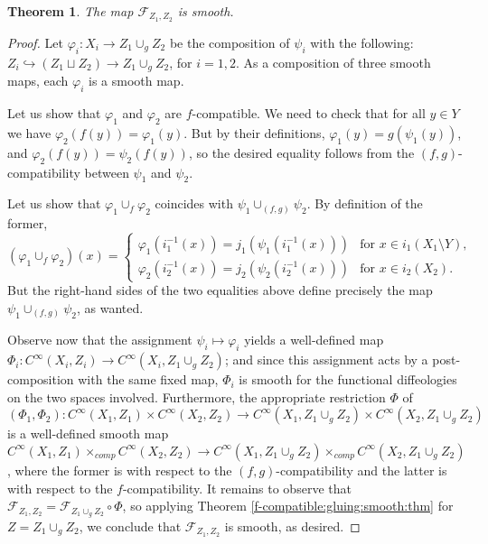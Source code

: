 \documentclass{article}
\newtheorem{thm}[lemma]{Theorem}
\begin{document}
\begin{thm}\label{f-g-compatible:gluing:smooth:thm}
The map $\mathcal{F}_{Z_1,Z_2}$ is smooth.
\end{thm}

\begin{proof}
Let $\varphi_i:X_i\to Z_1\cup_g Z_2$ be the composition of $\psi_i$ with the following: $Z_i\hookrightarrow(Z_1\sqcup Z_2)\to Z_1\cup_g Z_2$, for $i=1,2$. As a composition of three smooth maps, each
$\varphi_i$ is a smooth map.

Let us show that $\varphi_1$ and $\varphi_2$ are $f$-compatible. We need to check that for all $y\in Y$ we have $\varphi_2(f(y))=\varphi_1(y)$. But by their definitions, $\varphi_1(y)=g(\psi_1(y))$, and 
$\varphi_2(f(y))=\psi_2(f(y))$, so the desired equality follows from the $(f,g)$-compatibility between $\psi_1$ and $\psi_2$.

Let us show that $\varphi_1\cup_f\varphi_2$ coincides with $\psi_1\cup_{(f,g)}\psi_2$. By definition of the former, 
$$(\varphi_1\cup_f\varphi_2)(x)=\left\{\begin{array}{ll}\varphi_1(i_1^{-1}(x))=j_1(\psi_1(i_1^{-1}(x))) & \mbox{for }x\in i_1(X_1\setminus Y),\\
\varphi_2(i_2^{-1}(x))=j_2(\psi_2(i_2^{-1}(x))) & \mbox{for }x\in i_2(X_2).\end{array}\right.$$ But the right-hand sides of the two equalities above define precisely the map $\psi_1\cup_{(f,g)}\psi_2$, 
as wanted.

Observe now that the assignment $\psi_i\mapsto\varphi_i$ yields a well-defined map $\Phi_i:C^{\infty}(X_i,Z_i)\to C^{\infty}(X_i,Z_1\cup_g Z_2)$; and since this assignment acts by a post-composition with 
the same fixed map, $\Phi_i$ is smooth for the functional diffeologies on the two spaces involved. Furthermore, the appropriate restriction $\Phi$ of
$(\Phi_1,\Phi_2):C^{\infty}(X_1,Z_1)\times C^{\infty}(X_2,Z_2)\to C^{\infty}(X_1,Z_1\cup_g Z_2)\times C^{\infty}(X_2,Z_1\cup_g Z_2)$ is a well-defined smooth map 
$C^{\infty}(X_1,Z_1)\times_{comp}C^{\infty}(X_2,Z_2)\to C^{\infty}(X_1,Z_1\cup_g Z_2)\times_{comp}C^{\infty}(X_2,Z_1\cup_g Z_2)$, where the former is with respect to the $(f,g)$-compatibility and the latter 
is with respect to the $f$-compatibility. It remains to observe that $\mathcal{F}_{Z_1,Z_2}=\mathcal{F}_{Z_1\cup_g Z_2}\circ\Phi$, so applying Theorem \ref{f-compatible:gluing:smooth:thm} for 
$Z=Z_1\cup_g Z_2$, we conclude that $\mathcal{F}_{Z_1,Z_2}$ is smooth, as desired.
\end{proof}
\end{document}
